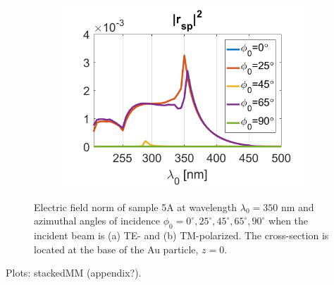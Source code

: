 \begin{figure}[htb!]
\begin{subfigure}{0.32\textwidth}
        \centering
        \includegraphics[width=\linewidth]{figures/ch4/S5A/FieldDistribution/phi0-90/S5A_rsp_phi0-90.png}
   \end{subfigure}
   \vspace{0.7cm}
   \caption{Electric field norm of sample 5A at wavelength $\lambda_0=350$ nm and azimuthal angles of incidence $\phi_0=0^\circ, 25^\circ, 45^\circ, 65^\circ, 90^\circ$ when the incident beam is (a) TE- and (b) TM-polarized. The cross-section is located at the base of the Au particle, $z=0$.}
   \label{fig:S5A_normE_phi0-90_wl350}   
\end{figure}











\clearpage


Plots: stackedMM (appendix?).

\clearpage
